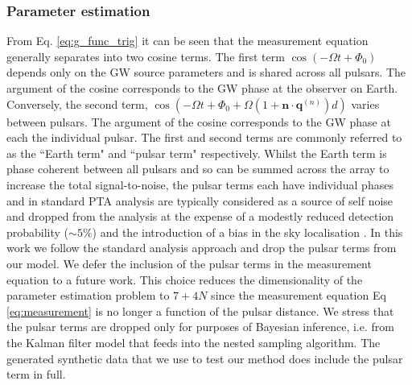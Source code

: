 \documentclass[fleqn,usenatbib,useAMS]{mnras}
\begin{document}
\subsubsection{Parameter estimation}\label{sec:parameter_estim}
From Eq. \ref{eq:g_func_trig} it can be seen that the measurement equation generally separates into two cosine terms. The first term $\cos(-\Omega t + \Phi_0)$ depends only on the GW source parameters and is shared across all pulsars. The argument of the cosine corresponds to the GW phase at the observer on Earth.  Conversely, the second term, $\cos \left(-\Omega t +\Phi_0 + \Omega \left(1 + \boldsymbol{n}\cdot \boldsymbol{q}^{(n)} \right)  d \right)$ varies between pulsars. The argument of the cosine corresponds to the GW phase at each the individual pulsar. The first and second terms are commonly referred to as the ``Earth term" and ``pulsar term" respectively. Whilst the Earth term is phase coherent between all pulsars and so can be summed across the array to increase the total signal-to-noise, the pulsar terms each have individual phases and in standard PTA analysis are typically considered as a source of self noise and dropped from the analysis \citep[e.g.][]{Sesana2010,Babak2012,Petiteau2013,Zhu2015,Taylors2016,Goldstein2018,Charisi2023arXiv230403786C} at the expense of a modestly reduced detection probability ($\sim 5 \%$) and the introduction of a bias in the sky localisation \citep{Zhupulsarterms,Chen2022}. In this work we follow the standard analysis approach and drop the pulsar terms from our model. We defer the inclusion of the pulsar terms in the measurement equation to a future work. This choice reduces the dimensionality of the parameter estimation problem to $7 + 4N$ since the measurement equation Eq \ref{eq:measurement} is no longer a function of the pulsar distance.  We stress that the pulsar terms are dropped only for purposes of Bayesian inference, i.e. from the Kalman filter model that feeds into the nested sampling algorithm. The generated synthetic data that we use to test our method does include the pulsar term in full. \newline
\end{document}
